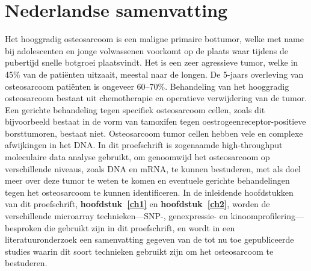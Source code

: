 

 
%



\chapter{Nederlandse samenvatting}\label{ch10}
\thispagestyle{empty}				%

Het hooggradig osteosarcoom is een maligne primaire bottumor, welke met name bij adolescenten en jonge volwassenen voorkomt op de plaats waar tijdens de pubertijd snelle botgroei plaatsvindt. Het is een zeer agressieve tumor, welke in 45\% van de pati\"enten uitzaait, meestal naar de longen. De 5-jaars overleving van osteosarcoom pati\"enten is ongeveer 60--70\%. Behandeling van het hooggradig osteosarcoom bestaat uit chemotherapie en operatieve verwijdering van de tumor. Een gerichte behandeling tegen specifiek osteosarcoom cellen, zoals dit bijvoorbeeld bestaat in de vorm van tamoxifen tegen oestrogeenreceptor\hyp{}positieve borsttumoren, bestaat niet. Osteosarcoom tumor cellen hebben vele en complexe afwijkingen in het DNA. In dit proefschrift is zogenaamde high\hyp{}throughput moleculaire data analyse gebruikt, om genoomwijd het osteosarcoom op verschillende niveaus, zoals DNA en mRNA, te kunnen bestuderen, met als doel meer over deze tumor te weten te komen en eventuele gerichte behandelingen tegen het osteosarcoom te kunnen identificeren. In de inleidende hoofdstukken van dit proefschrift, {\bf hoofdstuk~\ref{ch1}} en {\bf hoofdstuk~\ref{ch2}}, worden de verschillende microarray technieken---SNP-, genexpressie- en kinoomprofilering---besproken die gebruikt zijn in dit proefschrift, en wordt in een literatuuronderzoek een samenvatting gegeven van de tot nu toe gepubliceerde studies waarin dit soort technieken gebruikt zijn om het osteosarcoom te bestuderen.

